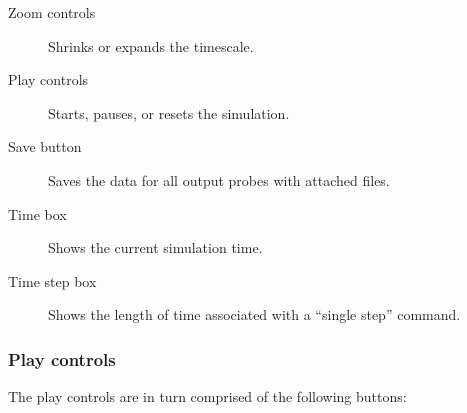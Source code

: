 \documentclass{article}
\begin{document}
\begin{description}

\item[Zoom controls]\mbox{}

Shrinks or expands the timescale.

\item[Play controls]\mbox{}

Starts, pauses, or resets the simulation.

\item[Save button]\mbox{}

Saves the data for all output probes with attached files.

\item[Time box]\mbox{}

Shows the current simulation time.

\item[Time step box]\mbox{}

Shows the length of time associated with a ``single step'' command.

\end{description}

\subsubsection{Play controls}
\label{PlayControlsSec}

The play controls are in turn comprised of the following buttons:
\end{document}
